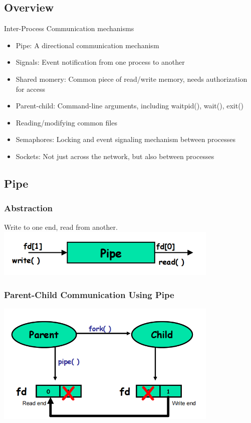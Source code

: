 \documentclass[12pt]{article}
\begin{document}
\subsection{Overview}
Inter-Process Communication mechanisms
\begin{itemize}
    \item Pipe: A directional communication mechanism
    \item Signals: Event notification from one process to another
    \item Shared momery: Common piece of read/write memory, needs authorization for access
    \item Parent-child: Command-line arguments, including waitpid(), wait(), exit()
    \item Reading/modifying common files
    \item Semaphores: Locking and event signaling mechanism between processes
    \item Sockets: Not just across the network, but also between processes
\end{itemize}

\subsection{Pipe}
\subsubsection{Abstraction}
Write to one end, read from another.
\newline
\includegraphics[width=0.8\textwidth]{PipeAbstraction.png}
\subsubsection{Parent-Child Communication Using Pipe}
\includegraphics[width=0.8\textwidth]{ParentChildCommunicationUsingPipe.png}
\end{document}
